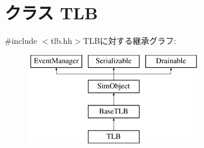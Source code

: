\hypertarget{classArmISA_1_1TLB}{
\section{クラス TLB}
\label{classArmISA_1_1TLB}
}


{\ttfamily \#include $<$tlb.hh$>$}TLBに対する継承グラフ:\begin{figure}[H]
\begin{center}
\leavevmode
\includegraphics[height=4cm]{classArmISA_1_1TLB}
\end{center}
\end{figure}
